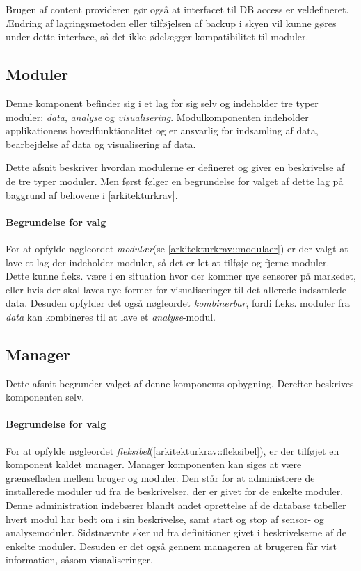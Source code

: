 Brugen af content provideren gør også at interfacet til DB access er veldefineret.
Ændring af lagringsmetoden eller tilføjelsen af backup i skyen vil kunne gøres under dette interface, så det ikke ødelægger kompatibilitet til moduler.

\subsection{Moduler}
Denne komponent befinder sig i et lag for sig selv og indeholder tre typer moduler: \textit{data}, \textit{analyse} og \textit{visualisering}.
Modulkomponenten indeholder applikationens hovedfunktionalitet og er ansvarlig for indsamling af data, bearbejdelse af data og visualisering af data.

Dette afsnit beskriver hvordan modulerne er defineret og giver en beskrivelse af de tre typer moduler.
Men først følger en begrundelse for valget af dette lag på baggrund af behovene i \cref{arkitekturkrav}.

\paragraph{Begrundelse for valg}
For at opfylde nøgleordet \textit{modulær}(se \cref{arkitekturkrav::modulaer}) er der valgt at lave et lag der indeholder moduler, så det er let at tilføje og fjerne moduler.
Dette kunne f.eks. være i en situation hvor der kommer nye sensorer på markedet, eller hvis der skal laves nye former for visualiseringer til det allerede indsamlede data.
Desuden opfylder det også nøgleordet \textit{kombinerbar}, fordi f.eks. moduler fra \textit{data} kan kombineres til at lave et \textit{analyse}-modul.



\subsection{Manager}\label{subsec:arkitektur-Manager}
Dette afsnit begrunder valget af denne komponents opbygning.
Derefter beskrives komponenten selv.

\paragraph{Begrundelse for valg}
For at opfylde nøgleordet \textit{fleksibel}(\cref{arkitekturkrav::fleksibel}), er der tilføjet en komponent kaldet manager.
Manager komponenten kan siges at være grænsefladen mellem bruger og moduler.
Den står for at administrere de installerede moduler ud fra de beskrivelser, der er givet for de enkelte moduler.
Denne administration indebærer blandt andet oprettelse af de database tabeller hvert modul har bedt om i sin beskrivelse, samt start og stop af sensor- og analysemoduler.
Sidstnævnte sker ud fra definitioner givet i beskrivelserne af de enkelte moduler.
Desuden er det også gennem manageren at brugeren får vist information, såsom visualiseringer.


